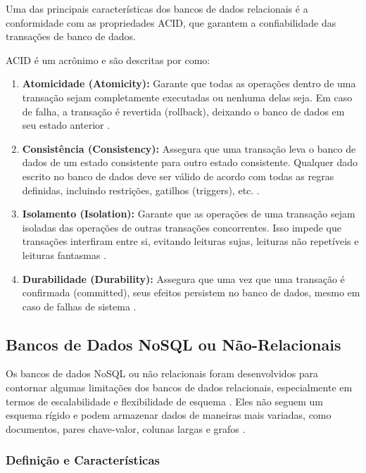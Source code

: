 Uma das principais características dos bancos de dados relacionais é a conformidade com as propriedades ACID, que garantem a confiabilidade das transações de banco de dados. 

ACID é um acrônimo e são descritas por \cite{gray_reuter1992}  como:

\begin{enumerate}
    \item \textbf{Atomicidade (Atomicity):} Garante que todas as operações dentro de uma transação sejam completamente executadas ou nenhuma delas seja. Em caso de falha, a transação é revertida (rollback), deixando o banco de dados em seu estado anterior \cite{gray_reuter1992}.
    \item \textbf{Consistência (Consistency):} Assegura que uma transação leva o banco de dados de um estado consistente para outro estado consistente. Qualquer dado escrito no banco de dados deve ser válido de acordo com todas as regras definidas, incluindo restrições, gatilhos (triggers), etc. \cite{gray_reuter1992}.
    \item \textbf{Isolamento (Isolation):} Garante que as operações de uma transação sejam isoladas das operações de outras transações concorrentes. Isso impede que transações interfiram entre si, evitando leituras sujas, leituras não repetíveis e leituras fantasmas \cite{gray_reuter1992}.
    \item \textbf{Durabilidade (Durability):} Assegura que uma vez que uma transação é confirmada (committed), seus efeitos persistem no banco de dados, mesmo em caso de falhas de sistema \cite{gray_reuter1992}.
\end{enumerate}

\subsection{Bancos de Dados NoSQL ou Não-Relacionais}

Os bancos de dados NoSQL ou não relacionais foram desenvolvidos para contornar algumas limitações dos bancos de dados relacionais, especialmente em termos de escalabilidade e flexibilidade de esquema \cite{cattell2011}. Eles não seguem um esquema rígido e podem armazenar dados de maneiras mais variadas, como documentos, pares chave-valor, colunas largas e grafos  \cite{cattell2011}.

\subsubsection{Definição e Características}

